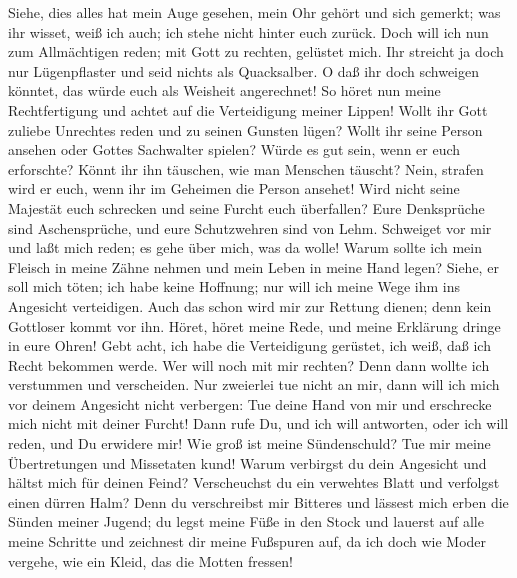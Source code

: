  Siehe, dies alles hat mein Auge gesehen, mein Ohr gehört
und sich gemerkt;  was ihr wisset, weiß ich auch; ich
stehe nicht hinter euch zurück.  Doch will ich nun zum
Allmächtigen reden; mit Gott zu rechten, gelüstet mich. 
Ihr streicht ja doch nur Lügenpflaster und seid nichts als Quacksalber.
 O daß ihr doch schweigen könntet, das würde euch als
Weisheit angerechnet!  So höret nun meine Rechtfertigung
und achtet auf die Verteidigung meiner Lippen!  Wollt ihr
Gott zuliebe Unrechtes reden und zu seinen Gunsten lügen? 
Wollt ihr seine Person ansehen oder Gottes Sachwalter spielen?
 Würde es gut sein, wenn er euch erforschte? Könnt ihr ihn
täuschen, wie man Menschen täuscht?  Nein, strafen wird
er euch, wenn ihr im Geheimen die Person ansehet!  Wird
nicht seine Majestät euch schrecken und seine Furcht euch überfallen?
 Eure Denksprüche sind Aschensprüche, und eure
Schutzwehren sind von Lehm.  Schweiget vor mir und laßt
mich reden; es gehe über mich, was da wolle!  Warum
sollte ich mein Fleisch in meine Zähne nehmen und mein Leben in meine
Hand legen?  Siehe, er soll mich töten; ich habe keine
Hoffnung; nur will ich meine Wege ihm ins Angesicht verteidigen.
 Auch das schon wird mir zur Rettung dienen; denn kein
Gottloser kommt vor ihn.  Höret, höret meine Rede, und
meine Erklärung dringe in eure Ohren!  Gebt acht, ich
habe die Verteidigung gerüstet, ich weiß, daß ich Recht bekommen werde.
 Wer will noch mit mir rechten? Denn dann wollte ich
verstummen und verscheiden.  Nur zweierlei tue nicht an
mir, dann will ich mich vor deinem Angesicht nicht verbergen:
 Tue deine Hand von mir und erschrecke mich nicht mit
deiner Furcht!  Dann rufe Du, und ich will antworten,
oder ich will reden, und Du erwidere mir!  Wie groß ist
meine Sündenschuld? Tue mir meine Übertretungen und Missetaten kund!
 Warum verbirgst du dein Angesicht und hältst mich für
deinen Feind?  Verscheuchst du ein verwehtes Blatt und
verfolgst einen dürren Halm?  Denn du verschreibst mir
Bitteres und lässest mich erben die Sünden meiner Jugend;
 du legst meine Füße in den Stock und lauerst auf alle
meine Schritte und zeichnest dir meine Fußspuren auf,  da
ich doch wie Moder vergehe, wie ein Kleid, das die Motten fressen!

